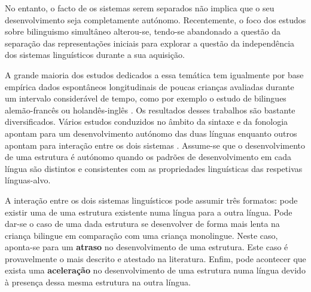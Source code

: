 \documentclass[output=paper]{LSP/langsci}
\begin{document}
No entanto, o facto de os sistemas serem separados não implica que o seu desenvolvimento seja completamente autónomo. Recentemente, o foco dos estudos sobre bilinguismo simultâneo alterou-se, tendo-se abandonado a questão da separação das representações iniciais para explorar a questão da independência dos sistemas linguísticos durante a sua aquisição. 

A grande maioria dos estudos dedicados a essa temática tem igualmente por base empírica dados espontâneos longitudinais de poucas crianças avaliadas durante um intervalo considerável de tempo, como por exemplo o estudo de bilingues alemão-francês \citep{leisel1989} ou holandês-inglês \citep{dehouwer1990}. Os resultados desses trabalhos são bastante diversificados. Vários estudos conduzidos no âmbito da sintaxe e da fonologia apontam para um desenvolvimento autónomo das duas línguas enquanto outros apontam para interação entre os dois sistemas \citep{genesee_etal2004,meisel2004}. Assume-se que o desenvolvimento de uma estrutura é autónomo quando os padrões de desenvolvimento em cada língua são distintos e consistentes com as propriedades linguísticas das respetivas línguas-alvo. 

A interação entre os dois sistemas linguísticos pode assumir três formatos: pode existir uma \textbf{} de uma estrutura existente numa língua para a outra língua. Pode dar-se o caso de uma dada estrutura se desenvolver de forma mais lenta na criança bilingue em comparação com uma criança monolingue. Neste caso, aponta-se para um \textbf{atraso} no desenvolvimento de uma estrutura. Este caso é provavelmente o mais descrito e atestado na literatura. Enfim, pode acontecer que exista uma \textbf{aceleração} no desenvolvimento de uma estrutura numa língua devido à presença dessa mesma estrutura na outra língua.
\end{document}
